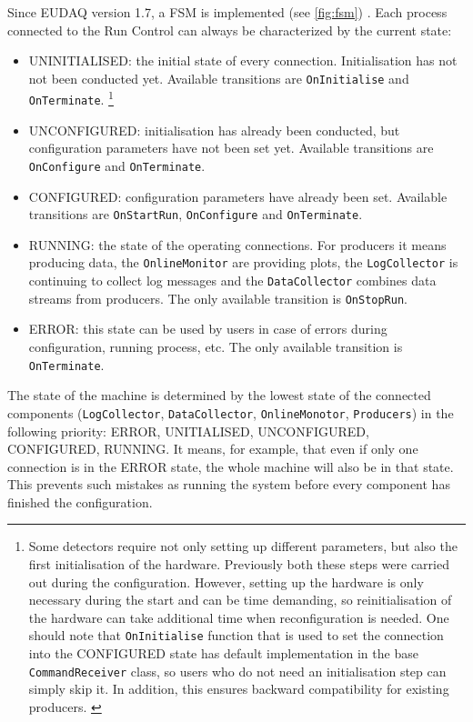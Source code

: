 Since EUDAQ version 1.7, a \gls{FSM} is implemented (see \autoref{fig:fsm}) \cite{Shirokova:2016}.
Each process connected to the Run Control can always be characterized by the current state:

\begin{itemize}
\item UNINITIALISED: the initial state of every connection. Initialisation has not not been conducted yet. Available transitions are \texttt{OnInitialise} and \texttt{OnTerminate}.%
\footnote{Some detectors require not only setting up different parameters, but also the first initialisation of the hardware. Previously both these steps were carried out during the configuration. However, setting up the hardware is only necessary during the start and can be time demanding, so reinitialisation of the hardware can take additional time when reconfiguration is needed.
One should note that \texttt{OnInitialise} function that is used to set the connection into the CONFIGURED state has default implementation in the base \texttt{CommandReceiver} class, so users who do not need an initialisation step can simply skip it. In addition, this ensures backward compatibility for existing producers. \cite{Shirokova:2016}}
\item UNCONFIGURED: initialisation has already been conducted, but configuration parameters have not been set yet. Available transitions are \texttt{OnConfigure} and \texttt{OnTerminate}.
\item CONFIGURED: configuration parameters have already been set. Available transitions are \texttt{OnStartRun}, \texttt{OnConfigure} and \texttt{OnTerminate}.
\item RUNNING: the state of the operating connections.  For producers it means producing data, the \texttt{OnlineMonitor} are providing plots, the \texttt{LogCollector} is continuing to collect log messages and the \texttt{DataCollector} combines data streams from producers. The only available transition is \texttt{OnStopRun}.
\item ERROR: this state can be used by users in case of errors during configuration, running process, etc. The only available transition is \texttt{OnTerminate}.
\end{itemize}

The state of the machine is determined by the lowest state of the connected components (\texttt{LogCollector}, \texttt{DataCollector}, \texttt{OnlineMonotor}, \texttt{Producers}) in the following priority: ERROR, UNITIALISED, UNCONFIGURED, CONFIGURED, RUNNING. It means, for example, that even if only one connection is in the ERROR state, the whole machine will also be in that state. This prevents such mistakes as running the system before every component has finished the configuration.

